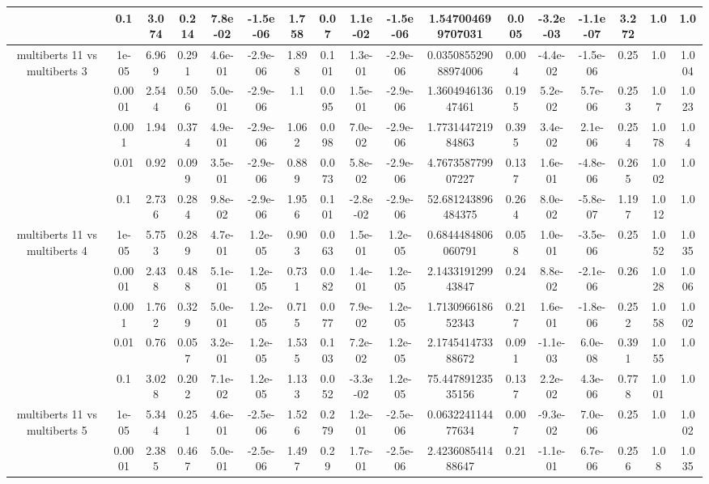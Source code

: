 \begin{tabular}{|c|c|c|c|c|c|c|c|c|c|c|c|c|c|c|c|c|}
 & 0.1 & 3.074 & 0.214 & 7.8e-02 & -1.5e-06 & 1.758 & 0.07 & 1.1e-02 & -1.5e-06 & 1.547004699707031 & 0.005 & -3.2e-03 & -1.1e-07 & 3.272 & 1.0 & 1.0 \\
\hline
\multirow{5}{*}{multiberts 11 vs multiberts 3} & 1e-05 & 6.969 & 0.291 & 4.6e-01 & -2.9e-06 & 1.898 & 0.101 & 1.3e-01 & -2.9e-06 & 0.035085529088974006 & 0.004 & -4.4e-02 & -1.5e-06 & 0.25 & 1.0 & 1.004 \\
 & 0.0001 & 2.544 & 0.506 & 5.0e-01 & -2.9e-06 & 1.1 & 0.095 & 1.5e-01 & -2.9e-06 & 1.360494613647461 & 0.195 & 5.2e-02 & 5.7e-06 & 0.253 & 1.07 & 1.023 \\
 & 0.001 & 1.94 & 0.374 & 4.9e-01 & -2.9e-06 & 1.062 & 0.098 & 7.0e-02 & -2.9e-06 & 1.773144721984863 & 0.395 & 3.4e-02 & 2.1e-06 & 0.254 & 1.078 & 1.04 \\
 & 0.01 & 0.92 & 0.099 & 3.5e-01 & -2.9e-06 & 0.889 & 0.073 & 5.8e-02 & -2.9e-06 & 4.767358779907227 & 0.137 & 1.6e-01 & -4.8e-06 & 0.265 & 1.002 & 1.0 \\
 & 0.1 & 2.736 & 0.284 & 9.8e-02 & -2.9e-06 & 1.956 & 0.101 & -2.8e-02 & -2.9e-06 & 52.681243896484375 & 0.264 & 8.0e-02 & -5.8e-07 & 1.197 & 1.012 & 1.0 \\
\hline
\multirow{5}{*}{multiberts 11 vs multiberts 4} & 1e-05 & 5.753 & 0.289 & 4.7e-01 & 1.2e-05 & 0.903 & 0.063 & 1.5e-01 & 1.2e-05 & 0.6844484806060791 & 0.058 & 1.0e-01 & -3.5e-06 & 0.25 & 1.052 & 1.035 \\
 & 0.0001 & 2.438 & 0.488 & 5.1e-01 & 1.2e-05 & 0.731 & 0.082 & 1.4e-01 & 1.2e-05 & 2.143319129943847 & 0.24 & 8.8e-02 & -2.1e-06 & 0.26 & 1.028 & 1.006 \\
 & 0.001 & 1.762 & 0.329 & 5.0e-01 & 1.2e-05 & 0.715 & 0.077 & 7.9e-02 & 1.2e-05 & 1.713096618652343 & 0.217 & 1.6e-01 & -1.8e-06 & 0.252 & 1.058 & 1.002 \\
 & 0.01 & 0.76 & 0.057 & 3.2e-01 & 1.2e-05 & 1.535 & 0.103 & 7.2e-02 & 1.2e-05 & 2.174541473388672 & 0.091 & -1.1e-03 & 6.0e-08 & 0.391 & 1.055 & 1.0 \\
 & 0.1 & 3.028 & 0.202 & 7.1e-02 & 1.2e-05 & 1.133 & 0.052 & -3.3e-02 & 1.2e-05 & 75.44789123535156 & 0.137 & 2.2e-02 & 4.3e-06 & 0.778 & 1.001 & 1.0 \\
\hline
\multirow{5}{*}{multiberts 11 vs multiberts 5} & 1e-05 & 5.344 & 0.251 & 4.6e-01 & -2.5e-06 & 1.526 & 0.279 & 1.2e-01 & -2.5e-06 & 0.063224114477634 & 0.007 & -9.3e-02 & 7.0e-06 & 0.25 & 1.0 & 1.002 \\
 & 0.0001 & 2.385 & 0.467 & 5.0e-01 & -2.5e-06 & 1.497 & 0.29 & 1.7e-01 & -2.5e-06 & 2.423608541488647 & 0.21 & -1.1e-01 & 6.7e-06 & 0.256 & 1.08 & 1.035 \\

\end{tabular}
